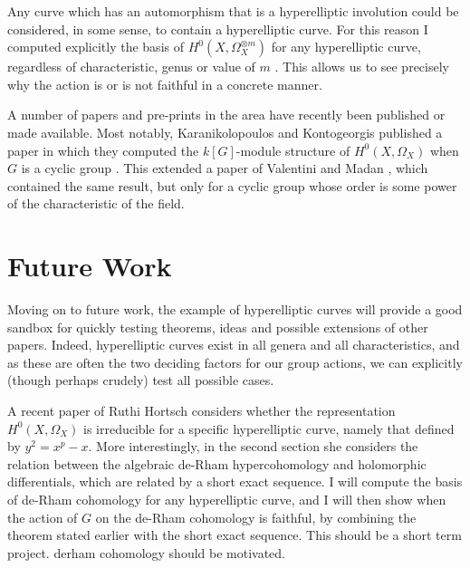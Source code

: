 \documentclass[draft, 11pt, notitlepage]{article} %
\theoremstyle{plain}
\theoremstyle{remark}
\begin{document}
Any curve which has an automorphism that is a hyperelliptic involution could be considered, in some sense, to contain a hyperelliptic curve.
For this reason I computed explicitly the basis of $H^0(X,\Omega_X^{\otimes m})$ for any hyperelliptic curve, regardless of characteristic, genus or value of $m$ \cite{faithfulaction}.
This allows us to see precisely why the action is or is not faithful in a concrete manner.

A number of papers and pre-prints in the area have recently been published or made available. Most notably, Karanikolopoulos and Kontogeorgis published a paper in which they computed the $k[G]$-module structure of $H^0(X,\Omega_X)$ when $G$ is a cyclic group \cite{kako}. This extended a paper of Valentini and Madan \cite{valmadan}, which contained the same result, but only for a cyclic group whose order is some power of the characteristic of the field.


\section{Future Work}
Moving on to future work, the example of hyperelliptic curves will provide a good sandbox for quickly testing theorems, ideas and possible extensions of other papers. Indeed, hyperelliptic curves exist in all genera and all characteristics, and as these are often the two deciding factors for our group actions, we can explicitly (though perhaps crudely) test all possible cases.


A recent paper of Ruthi Hortsch \cite{hortsch} considers whether the representation $H^0(X,\Omega_X)$ is irreducible for a specific hyperelliptic curve, namely that defined by $y^2 = x^p-x$.
 More interestingly, in the second section she considers the relation between the algebraic de-Rham hypercohomology and holomorphic differentials, which are related by a short exact sequence.
I will compute the basis of de-Rham cohomology for any hyperelliptic curve,
 and I will then show when the action of $G$ on the de-Rham cohomology is faithful, by combining the theorem stated earlier with the short exact sequence.
This should be a short term project.
derham cohomology should be motivated.
\end{document}
